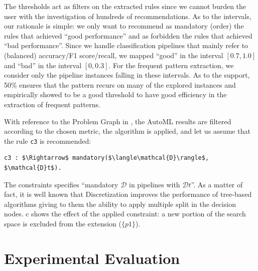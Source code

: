 The thresholds act as filters on the extracted rules since we cannot burden the user with the investigation of hundreds of recommendations. 
As to the intervals, our rationale is simple: we only want to recommend as mandatory (order) the rules that achieved ``good performance'' and as forbidden the rules that achieved ``bad performance''.
Since we handle classification pipelines that mainly refer to (balanced) accuracy/F1 score/recall, we mapped ``good'' in the interval $[0.7, 1.0]$ and ``bad'' in the interval $[0, 0.3]$. For the frequent pattern extraction, we consider only the pipeline instances falling in these intervals.
As to the support, 50\% ensures that the pattern recurs on many of the explored instances and empirically showed to be a good threshold to have good efficiency in the extraction of frequent patterns.

\begin{example}
With reference to the Problem Graph in ,
the AutoML results are filtered according to the chosen metric, the algorithm \cite{raschkas_2018_mlxtend} is applied, and let us assume that the rule \texttt{c3} is recommended:
\begin{lstlisting}[mathescape=true]
c3 : $\Rightarrow$ mandatory($\langle\mathcal{D}\rangle$, $\mathcal{D}t$).
\end{lstlisting}
The constraints specifies ``mandatory $\mathcal{D}$ in pipelines with $\mathcal{D}t$''.
As a matter of fact, it is well known that Discretization improves the performance of tree-based algorithms giving to them the ability to apply multiple split in the decision nodes.
c shows the effect of the applied constraint: a new portion of the search space is excluded from the extension ($\{p1\}$).
\end{example}


\section{Experimental Evaluation}\label{sec:test}

